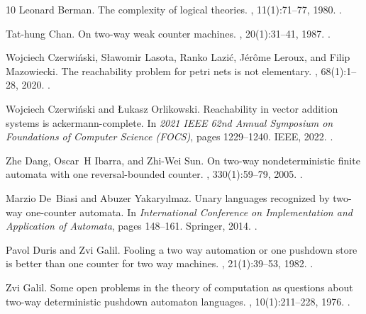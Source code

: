 \documentclass[11pt,a4paper]{amsart}
\theoremstyle{definition}
\begin{document}
\begin{thebibliography}{10}
Leonard Berman.
\newblock The complexity of logical theories.
, 11(1):71--77, 1980.
\newblock \href {https://doi.org/10.1016/0304-3975(80)90037-7}
  {}.

Tat-hung Chan.
\newblock On two-way weak counter machines.
, 20(1):31--41, 1987.
\newblock \href {https://doi.org/10.1007/BF01692057}
  {}.

Wojciech Czerwi{\'n}ski, S{\l}awomir Lasota, Ranko Lazi{\'c}, J{\'e}r{\^o}me
  Leroux, and Filip Mazowiecki.
\newblock The reachability problem for petri nets is not elementary.
, 68(1):1--28, 2020.
\newblock \href {https://doi.org/10.1145/3422822} {}.

Wojciech Czerwi{\'n}ski and {\L}ukasz Orlikowski.
\newblock Reachability in vector addition systems is ackermann-complete.
\newblock In {\em 2021 IEEE 62nd Annual Symposium on Foundations of Computer
  Science (FOCS)}, pages 1229--1240. IEEE, 2022.
\newblock \href {https://doi.org/10.1109/FOCS52979.2021.00120}
  {}.

Zhe Dang, Oscar~H Ibarra, and Zhi-Wei Sun.
\newblock On two-way nondeterministic finite automata with one reversal-bounded
  counter.
, 330(1):59--79, 2005.
\newblock \href {https://doi.org/10.1016/j.tcs.2004.09.010}
  {}.

Marzio De~Biasi and Abuzer Yakary{\i}lmaz.
\newblock Unary languages recognized by two-way one-counter automata.
\newblock In {\em International Conference on Implementation and Application of
  Automata}, pages 148--161. Springer, 2014.
\newblock \href {https://doi.org/10.1007/978-3-319-08846-4_11}
  {}.

Pavol Duris and Zvi Galil.
\newblock Fooling a two way automation or one pushdown store is better than one
  counter for two way machines.
, 21(1):39--53, 1982.
\newblock \href {https://doi.org/10.1016/0304-3975(82)90087-1}
  {}.

Zvi Galil.
\newblock Some open problems in the theory of computation as questions about
  two-way deterministic pushdown automaton languages.
, 10(1):211--228, 1976.
\newblock \href {https://doi.org/10.1007/BF01683273}
  {}.


\end{thebibliography}
\end{document}
